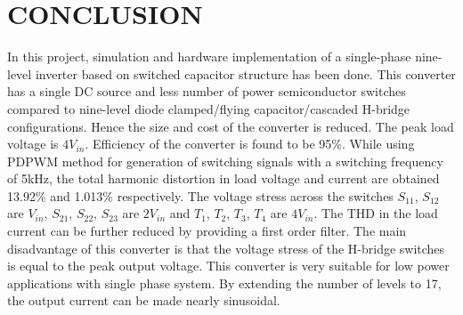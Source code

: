 \documentclass[12pt,a4paper]{report}
\begin{document}
\chapter{CONCLUSION}
\hspace{0.1in} In this project, simulation and hardware implementation of a single-phase nine-level inverter based on switched capacitor structure has been done. This converter has a single DC source and less number of power semiconductor switches compared to nine-level diode clamped/flying capacitor/cascaded H-bridge configurations. Hence the size and cost of the converter is reduced. The peak load voltage is $4V_{in}$. Efficiency of the converter is found to be 95\%. While using PDPWM method for generation of switching signals with a switching frequency of 5kHz, the total harmonic distortion in load voltage and current are obtained 13.92\% and 1.013\% respectively. The voltage stress across the switches $S_{11}$, $S_{12}$ are $V_{in}$, $S_{21}$, $S_{22}$, $S_{23}$ are $2V_{in}$ and $T_1$, $T_2$, $T_3$, $T_4$ are $4V_{in}$. The THD in the load current can be further reduced by providing a first order filter. The main disadvantage of this converter is that the voltage stress of the H-bridge switches is equal to the peak output voltage. This converter is very suitable for low power applications with single phase system. By extending the number of levels to 17, the output current can be made nearly sinusoidal. 



\nocite{ngo2018single}
\nocite{williams2006principles}
\nocite{ye2014step}
\nocite{bhagyalakshmi2017switched}
\nocite{rodriguez2002multilevel}
\nocite{kouro2010recent}
\nocite{hinago2011switched}
\end{document}
